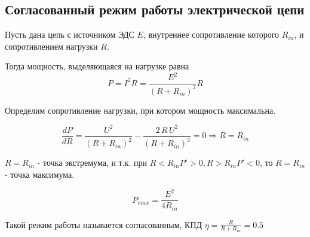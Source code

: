 \subsection{Согласованный режим работы электрической цепи}

Пусть дана цепь с источником ЭДС $E$, внутреннее сопротивление которого $R_{in}$, и сопротивлением нагрузки $R$.

Тогда мощность, выделяющаяся на нагрузке равна
\begin{equation}
P = I^2 R = \frac{E^2}{(R+R_{in})^2} R
\end{equation}

Определим сопротивление нагрузки, при котором мощность максимальна.

\begin{equation}
\frac{dP}{dR} = \frac{{U}^{2}}{{( R+R_{in}) }^{2}}-\frac{2\,R\,{U}^{2}}{{( R+R_{in}) }^{3}} = 0 \Longrightarrow R=R_{in}
\end{equation}

$R=R_{in}$ - точка экстремума, и т.к. при $R<R_{in} P'>0, R>R_{in} P'<0$, то $R=R_{in}$ - точка максимума.

\begin{equation}
P_{max} = \frac{E^2}{4 R_{in}}
\end{equation}

Такой режим работы называется согласованным, КПД $\eta =\frac{R}{R+R_{in}}  = 0.5$




\pagebreak


